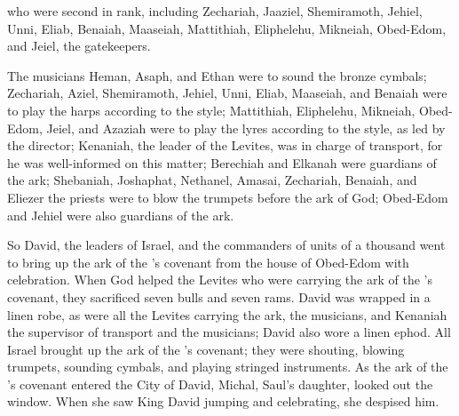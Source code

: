 {who were second in rank,
including Zechariah,
Jaaziel,
Shemiramoth,
Jehiel,
Unni,
Eliab,
Benaiah,
Maaseiah,
Mattithiah,
Eliphelehu,
Mikneiah,
Obed-Edom,
and Jeiel,
the gatekeepers.
\par }{\PP {}The musicians
Heman,
Asaph,
and Ethan
were to sound the bronze
cymbals;
Zechariah,
Aziel,
Shemiramoth,
Jehiel,
Unni,
Eliab,
Maaseiah,
and Benaiah
were to play the harps
according to the
{} style;
Mattithiah,
Eliphelehu,
Mikneiah,
Obed-Edom,
Jeiel,
and Azaziah
were to play the lyres
according
to the
{}
style, as led by the director;
Kenaniah,
the leader
of the Levites,
was in charge of transport,
for
he was well-informed on this matter;
Berechiah
and Elkanah
were guardians
of the ark;
Shebaniah,
Joshaphat,
Nethanel,
Amasai,
Zechariah,
Benaiah,
and Eliezer
the priests
were
to blow
the trumpets
before
the ark
of God;
Obed-Edom
and Jehiel
were also guardians
of the ark.
\par }{\PP {}So
David,
the leaders
of Israel,
and the commanders
of units of a thousand
went
to bring up
the ark
of the
{}’s
covenant
from
the house
of Obed-Edom
with celebration.
When
God
helped
the Levites
who were carrying
the ark
of the
{}’s
covenant,
they sacrificed
seven
bulls
and seven
rams.
David
was wrapped
in a linen
robe,
as were all
the Levites
carrying
the ark,
the musicians,
and Kenaniah
the supervisor
of transport
and the musicians;
David
also wore a linen
ephod.
All
Israel
brought up
the ark
of the
{}’s
covenant;
they were shouting,
blowing
trumpets,
sounding cymbals,
and playing
stringed instruments.
As the ark
of the
{}’s
covenant
entered
the City
of David,
Michal,
Saul’s
daughter,
looked
out the window.
When she saw
King
David
jumping
and celebrating,
she despised him.

}
